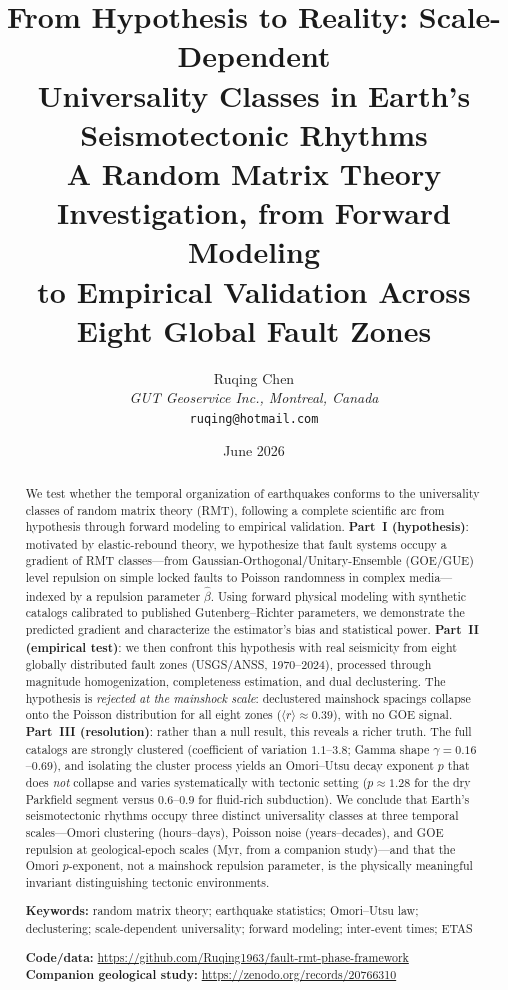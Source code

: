 \documentclass[12pt,a4paper]{article}
\title{\textbf{From Hypothesis to Reality: Scale-Dependent\\
Universality Classes in Earth's Seismotectonic Rhythms}\\[4pt]
\large A Random Matrix Theory Investigation, from Forward Modeling\\
to Empirical Validation Across Eight Global Fault Zones}
\author{Ruqing Chen\\
\textit{GUT Geoservice Inc., Montreal, Canada}\\
\texttt{ruqing@hotmail.com}}
\date{June 2026}
\begin{document}
\maketitle

\begin{abstract}
We test whether the temporal organization of earthquakes conforms to the universality classes of random matrix theory (RMT), following a complete scientific arc from hypothesis through forward modeling to empirical validation. \textbf{Part~I (hypothesis)}: motivated by elastic-rebound theory, we hypothesize that fault systems occupy a gradient of RMT classes---from Gaussian-Orthogonal/Unitary-Ensemble (GOE/GUE) level repulsion on simple locked faults to Poisson randomness in complex media---indexed by a repulsion parameter $\hat\beta$. Using forward physical modeling with synthetic catalogs calibrated to published Gutenberg--Richter parameters, we demonstrate the predicted gradient and characterize the estimator's bias and statistical power. \textbf{Part~II (empirical test)}: we then confront this hypothesis with real seismicity from eight globally distributed fault zones (USGS/ANSS, 1970--2024), processed through magnitude homogenization, completeness estimation, and dual declustering. The hypothesis is \emph{rejected at the mainshock scale}: declustered mainshock spacings collapse onto the Poisson distribution for all eight zones ($\langle r\rangle\approx0.39$), with no GOE signal. \textbf{Part~III (resolution)}: rather than a null result, this reveals a richer truth. The full catalogs are strongly clustered (coefficient of variation $1.1$--$3.8$; Gamma shape $\gamma=0.16$--$0.69$), and isolating the cluster process yields an Omori--Utsu decay exponent $p$ that does \emph{not} collapse and varies systematically with tectonic setting ($p\approx1.28$ for the dry Parkfield segment versus $0.6$--$0.9$ for fluid-rich subduction). We conclude that Earth's seismotectonic rhythms occupy three distinct universality classes at three temporal scales---Omori clustering (hours--days), Poisson noise (years--decades), and GOE repulsion at geological-epoch scales (Myr, from a companion study)---and that the Omori $p$-exponent, not a mainshock repulsion parameter, is the physically meaningful invariant distinguishing tectonic environments.

\medskip
\noindent\textbf{Keywords:} random matrix theory; earthquake statistics; Omori--Utsu law; declustering; scale-dependent universality; forward modeling; inter-event times; ETAS

\medskip
\noindent\textbf{Code/data:} \url{https://github.com/Ruqing1963/fault-rmt-phase-framework}\\
\textbf{Companion geological study:} \url{https://zenodo.org/records/20766310}
\end{abstract}
\end{document}
